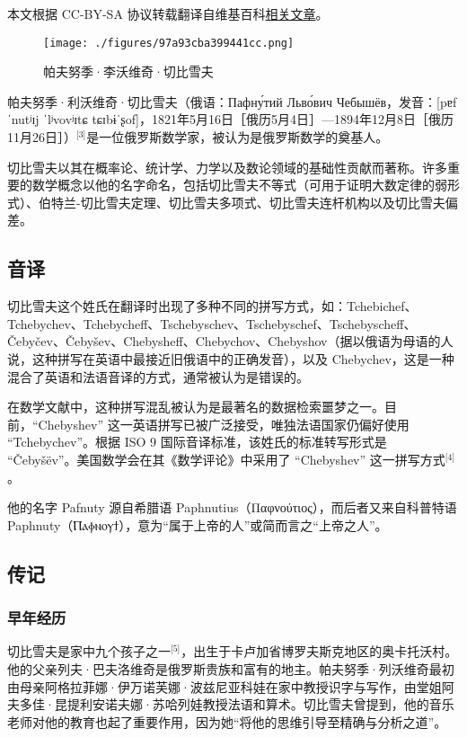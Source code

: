 
本文根据 CC-BY-SA 协议转载翻译自维基百科\href{https://en.wikipedia.org/wiki/Pafnuty_Chebyshev}{相关文章}。

\begin{figure}[ht]
\centering
\texttt{[image: ./figures/97a93cba399441cc.png]}
\caption{帕夫努季·李沃维奇·切比雪夫} \label{fig_PFNJ_1}
\end{figure}
帕夫努季·利沃维奇·切比雪夫（俄语：Пафну́тий Льво́вич Чебышёв，发音：[pɐfˈnutʲɪj ˈlʲvovʲɪtɕ tɕɪbɨˈʂof]，1821年5月16日［俄历5月4日］—1894年12月8日［俄历11月26日］）\(^\text{[3]}\)是一位俄罗斯数学家，被认为是俄罗斯数学的奠基人。

切比雪夫以其在概率论、统计学、力学以及数论领域的基础性贡献而著称。许多重要的数学概念以他的名字命名，包括切比雪夫不等式（可用于证明大数定律的弱形式）、伯特兰-切比雪夫定理、切比雪夫多项式、切比雪夫连杆机构以及切比雪夫偏差。
\subsection{音译}
切比雪夫这个姓氏在翻译时出现了多种不同的拼写方式，如：Tchebichef、Tchebychev、Tchebycheff、Tschebyschev、Tschebyschef、Tschebyscheff、Čebyčev、Čebyšev、Chebysheff、Chebychov、Chebyshov（据以俄语为母语的人说，这种拼写在英语中最接近旧俄语中的正确发音），以及 Chebychev，这是一种混合了英语和法语音译的方式，通常被认为是错误的。

在数学文献中，这种拼写混乱被认为是最著名的数据检索噩梦之一。目前，“Chebyshev” 这一英语拼写已被广泛接受，唯独法语国家仍偏好使用 “Tchebychev”。根据 ISO 9 国际音译标准，该姓氏的标准转写形式是 “Čebyšëv”。美国数学会在其《数学评论》中采用了 “Chebyshev” 这一拼写方式\(^\text{[4]}\)。

他的名字 Pafnuty 源自希腊语 Paphnutius（Παφνούτιος），而后者又来自科普特语 Paphnuty（Ⲡⲁⲫⲛⲟⲩϯ），意为“属于上帝的人”或简而言之“上帝之人”。
\subsection{传记}
\subsubsection{早年经历}
切比雪夫是家中九个孩子之一\(^\text{[5]}\)，出生于卡卢加省博罗夫斯克地区的奥卡托沃村。他的父亲列夫·巴夫洛维奇是俄罗斯贵族和富有的地主。帕夫努季·列沃维奇最初由母亲阿格拉菲娜·伊万诺芙娜·波兹尼亚科娃在家中教授识字与写作，由堂姐阿夫多佳·昆提利安诺夫娜·苏哈列娃教授法语和算术。切比雪夫曾提到，他的音乐老师对他的教育也起了重要作用，因为她“将他的思维引导至精确与分析之道”。

